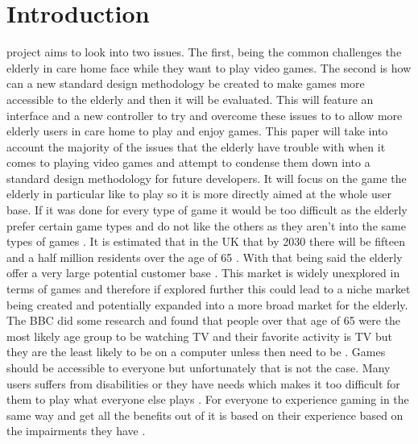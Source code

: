 \documentclass[journal]{IEEEtran}
\begin{document}
\section{Introduction}
% 
% 
% 
% 
 project aims to look into two issues. The first, being the common challenges the elderly in care home face while they want to play video games. The second is how can a new standard design methodology be created to make games more accessible to the elderly and then it will be evaluated. This will feature an interface and a new controller to try and overcome these issues to to allow more elderly users in care home to play and enjoy games. 
\newline
This paper will take into account the majority of the issues that the elderly have trouble with when it comes to playing video games and attempt to condense them down into a standard design methodology for future developers. It will focus on the game the elderly in particular like to play so it is more directly aimed at the whole user base. If it was done for every type of game it would be too difficult as the elderly prefer certain game types \cite{whitcomb_computer_1990} and do not like the others as they aren't into the same types of games \cite{whitcomb_computer_1990}.
\newline 
It is estimated that in the UK that by 2030 there will be fifteen and a half million  residents over the age of 65 \cite{noauthor_ageing_nodate}. With that being said the elderly offer a very large potential customer base \cite{ijsselsteijn_digital_2007}. This market is widely unexplored in terms of games and therefore if explored further this could lead to a niche market being created and potentially expanded into a more broad market for the elderly. The BBC did some research and found that people over that age of 65 were the most likely age group to be watching TV and their favorite activity is TV but they are the least likely to be on a computer unless then need to be \cite{ijsselsteijn_digital_2007}. Games should be accessible to everyone but unfortunately that is not the case. Many users suffers from disabilities or they have needs which makes it too difficult for them to play what everyone else plays \cite{torrente_introducing_2011}. For everyone to experience gaming in the same way and get all the benefits out of it is based on their experience based on the impairments they have \cite{gerling_long-term_2015}.
\end{document}
